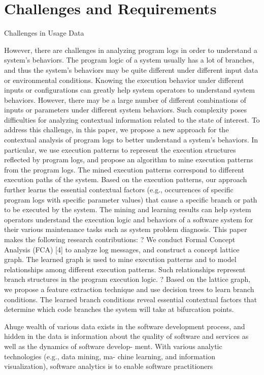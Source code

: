 \section{Challenges and Requirements}

Challenges in Usage Data

However, there are challenges in analyzing program logs in
order to understand a system’s behaviors. The program logic of a system usually has a lot of branches, and thus the system’s behaviors may be quite different under different input data or environmental conditions. Knowing the execution behavior under different inputs or configurations can greatly help system operators to understand system behaviors. However, there may be a large number of different combinations of inputs or parameters under different system behaviors. Such complexity poses difficulties for analyzing contextual information related to the state of interest. To address this challenge, in this paper, we propose a new
approach for the contextual analysis of program logs to better understand a system’s behaviors. In particular, we use execution patterns to represent the execution structures reflected by program logs, and propose an algorithm to mine execution patterns from the program logs. The mined execution patterns correspond to different execution paths of the system. Based on the execution patterns, our approach further learns the essential contextual factors (e.g., occurrences of specific program logs with specific parameter values) that cause a specific branch or path to be executed by the system. The mining and learning results can help system operators understand the execution logic and behaviors of a software system for their various maintenance tasks such as system problem diagnosis. This paper makes the following research contributions: ? We conduct Formal Concept Analysis (FCA) [4] to analyze log messages, and construct a concept lattice graph. The learned graph is used to mine execution patterns and to model relationships among different execution patterns. Such relationships represent branch structures in the program execution logic.
? Based on the lattice graph, we propose a feature extraction technique and use decision trees to learn branch conditions. The learned branch conditions reveal essential contextual factors that determine which code branches the system will take at bifurcation points.

Ahuge wealth of various data exists in the software development
process, and hidden in the data is information about the quality of software and services as well as the dynamics of software develop- ment. With various analytic technologies (e.g., data mining, ma- chine learning, and information visualization), software analytics is to enable software practitioners


